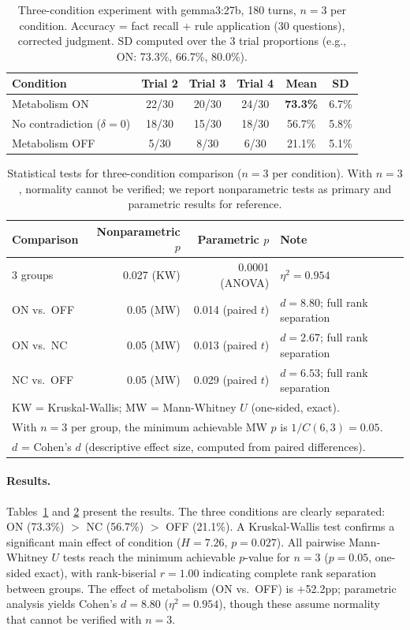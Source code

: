 \documentclass[11pt,a4paper]{article}
\begin{document}
\begin{table}[htbp]
\centering
\caption{Three-condition experiment with gemma3:27b, 180 turns, $n = 3$ per condition. Accuracy = fact recall + rule application (30 questions), corrected judgment. SD computed over the 3 trial proportions (e.g., ON: 73.3\%, 66.7\%, 80.0\%).}
\label{tab:threecond}
\begin{tabular}{lccccc}
\toprule
Condition & Trial 2 & Trial 3 & Trial 4 & Mean & SD \\
\midrule
Metabolism ON & 22/30 & 20/30 & 24/30 & \textbf{73.3\%} & 6.7\% \\
No contradiction ($\delta = 0$) & 18/30 & 15/30 & 18/30 & 56.7\% & 5.8\% \\
Metabolism OFF & 5/30 & 8/30 & 6/30 & 21.1\% & 5.1\% \\
\bottomrule
\end{tabular}
\end{table}

\begin{table}[htbp]
\centering
\caption{Statistical tests for three-condition comparison ($n = 3$ per condition). With $n = 3$, normality cannot be verified; we report nonparametric tests as primary and parametric results for reference.}
\label{tab:statistics}
\begin{tabular}{lrrl}
\toprule
Comparison & Nonparametric $p$ & Parametric $p$ & Note \\
\midrule
3 groups & 0.027 (KW) & 0.0001 (ANOVA) & $\eta^2 = 0.954$ \\
ON vs.\ OFF & 0.05 (MW) & 0.014 (paired $t$) & $d = 8.80$; full rank separation \\
ON vs.\ NC & 0.05 (MW) & 0.013 (paired $t$) & $d = 2.67$; full rank separation \\
NC vs.\ OFF & 0.05 (MW) & 0.029 (paired $t$) & $d = 6.53$; full rank separation \\
\bottomrule
\multicolumn{4}{l}{\footnotesize KW = Kruskal-Wallis; MW = Mann-Whitney $U$ (one-sided, exact).}\\
\multicolumn{4}{l}{\footnotesize With $n = 3$ per group, the minimum achievable MW $p$ is $1/C(6,3) = 0.05$.}\\
\multicolumn{4}{l}{\footnotesize $d$ = Cohen's $d$ (descriptive effect size, computed from paired differences).}
\end{tabular}
\end{table}

\paragraph{Results.}
Tables~\ref{tab:threecond} and \ref{tab:statistics} present the results.
The three conditions are clearly separated: ON (73.3\%) $>$ NC (56.7\%) $>$ OFF (21.1\%).
A Kruskal-Wallis test confirms a significant main effect of condition ($H = 7.26$, $p = 0.027$).
All pairwise Mann-Whitney $U$ tests reach the minimum achievable $p$-value for $n = 3$ ($p = 0.05$, one-sided exact), with rank-biserial $r = 1.00$ indicating complete rank separation between groups.
The effect of metabolism (ON vs.\ OFF) is $+$52.2pp; parametric analysis yields Cohen's $d = 8.80$ ($\eta^2 = 0.954$), though these assume normality that cannot be verified with $n = 3$.
\end{document}
